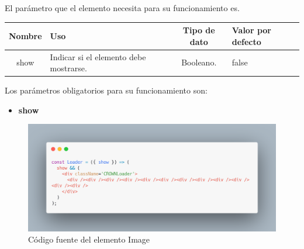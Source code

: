El parámetro que el elemento necesita para su funcionamiento es.
\newline
    \newline
    \begin{center}
     \begin{tabular}{ | c |  p{5cm}  | c | p{3cm} |} 
     \hline
     \textbf{Nombre} &  \textbf{Uso} &  \textbf{ Tipo de dato} &  \textbf{Valor por defecto}\\ [0.5ex] 
     \hline\hline
     show &  Indicar si el elemento debe mostrarse. &   Booleano. &  false \\  [2.5ex] 
     \hline
    \end{tabular}
    \end{center}
    \newline
                \newline
Los parámetros obligatorios para su funcionamiento son:
\begin{itemize}
\item \textbf{show} 
\end{itemize}
\newline
    \newline
    \begin{figure}[H]
    \centering
    \includegraphics[width=1\textwidth]{./Imagenes/8.36.png}
    \caption[Código fuente del elemento Image]{Código fuente del elemento Image}
    \end{figure}
\clearpage


